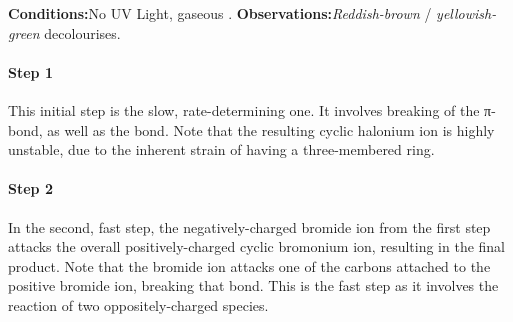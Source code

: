 			\vspace{1.5em}

			\vbox{\textbf{Conditions:}\tabto{35mm}No UV Light, gaseous .}	%
			\vbox{\textbf{Observations:}\tabto{35mm}\textit{\color{Mahogany}Reddish-brown}  / \textit{\color{YellowGreen}yellowish-green}  decolourises.}

			\paragraph{Step 1}

			This initial step is the slow, rate-determining one. It involves breaking of the π-bond, as well as the  bond.
			Note that the resulting cyclic halonium ion is highly unstable, due to the inherent strain of having a
			three-membered ring.



			\paragraph{Step 2}

			In the second, fast step, the negatively-charged bromide ion from the first step attacks the overall
			positively-charged cyclic bromonium ion, resulting in the final product. Note that the bromide ion attacks
			one of the carbons attached to the positive bromide ion, breaking that bond. This is the fast step as it
			involves the reaction of two oppositely-charged species.

